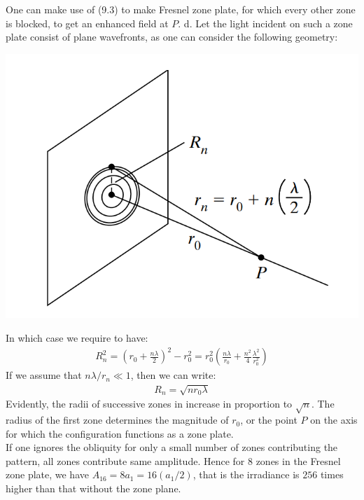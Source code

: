 \documentclass[11pt]{book}
\theoremstyle{break}
\theoremstyle{break}
\begin{document}
One can make use of  (9.3) to make Fresnel zone plate, for which every other zone is blocked, to get an enhanced field at $P$. d. Let the light incident on such a zone plate consist of plane wavefronts, as one can consider the following geometry:
\begin{center}
\includegraphics[scale=0.5]{zonalPlate}
\end{center}
In which case we require to have:
\begin{align*}
R_n^2 = \left( r_0 + \frac{n\lambda}{2}\right)^2 - r_0^2 = r_0^2 \left( \frac{n\lambda}{r_0} + \frac{n^2}{4}\frac{\lambda^2}{r_0^2}\right)
\end{align*}
If we assume that $n\lambda/r_n \ll 1$, then we can write:
\begin{align*}
R_n = \sqrt{n r_0 \lambda}
\end{align*}
Evidently, the radii of successive zones in increase in proportion to $\sqrt{n}$. The radius of the first zone determines the magnitude
of $r_0$, or the point $P$ on the axis for which the configuration functions as a zone plate. \\

If one ignores the obliquity for only a small number of zones contributing the pattern, all zones contribute same amplitude. Hence for $8$ zones in the Fresnel zone plate, we have $A_{16} = 8a_1 = 16 (a_1/2)$, that is the irradiance is $256$ times higher than that without the zone plane. \\
\end{document}
